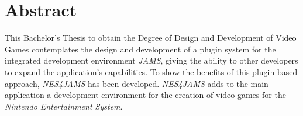 \chapter{Abstract} \label{ch:abstract}

This Bachelor's Thesis to obtain the Degree of Design
and Development of Video Games contemplates the design
and development of a plugin system for the integrated
development environment \textit{JAMS},
giving the ability to other developers to expand the
application's capabilities.
To show the benefits of this plugin-based approach,
\textit{NES4JAMS} has been developed.
\emph{NES4JAMS} adds to the main application
a development environment for the creation of
video games for the \textit{Nintendo Entertainment System}.
